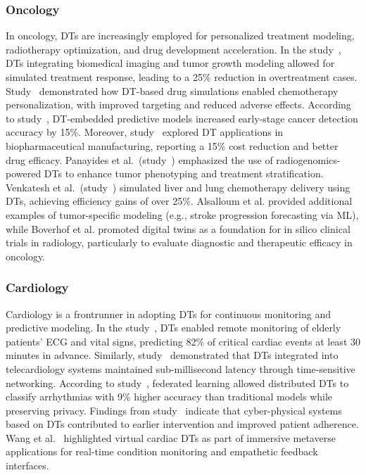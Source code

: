 \documentclass[10pt,a4paper]{article}
\begin{document}
\subsubsection*{Oncology}
In oncology, DTs are increasingly employed for personalized treatment modeling, radiotherapy optimization, and drug development acceleration.  
In the study~\cite{wu2022}, DTs integrating biomedical imaging and tumor growth modeling allowed for simulated treatment response, leading to a 25\% reduction in overtreatment cases. Study~\cite{Balasubramanyam2024} demonstrated how DT-based drug simulations enabled chemotherapy personalization, with improved targeting and reduced adverse effects.  
According to study~\cite{Cellina2023}, DT-embedded predictive models increased early-stage cancer detection accuracy by 15\%.  
Moreover, study~\cite{Puranik2022} explored DT applications in biopharmaceutical manufacturing, reporting a 15\% cost reduction and better drug efficacy. Panayides et al.\ (study~\cite{Panayides2020}) emphasized the use of radiogenomics-powered DTs to enhance tumor phenotyping and treatment stratification.  
Venkatesh et al.\ (study~\cite{Venkatesh2024}) simulated liver and lung chemotherapy delivery using DTs, achieving efficiency gains of over 25\%.  
Alsalloum et al.\cite{Alsalloum2024} provided additional examples of tumor-specific modeling (e.g., stroke progression forecasting via ML), while Boverhof et al.\cite{Boverhof2024} promoted digital twins as a foundation for in silico clinical trials in radiology, particularly to evaluate diagnostic and therapeutic efficacy in oncology.

\subsubsection*{Cardiology}
Cardiology is a frontrunner in adopting DTs for continuous monitoring and predictive modeling.  
In the study~\cite{liu2019}, DTs enabled remote monitoring of elderly patients’ ECG and vital signs, predicting 82\% of critical cardiac events at least 30 minutes in advance. Similarly, study~\cite{Lu2023} demonstrated that DTs integrated into telecardiology systems maintained sub-millisecond latency through time-sensitive networking.  
According to study~\cite{Ali2023}, federated learning allowed distributed DTs to classify arrhythmias with 9\% higher accuracy than traditional models while preserving privacy.  
Findings from study~\cite{Khater2024b} indicate that cyber-physical systems based on DTs contributed to earlier intervention and improved patient adherence.  
Wang et al.~\cite{Wang2025} highlighted virtual cardiac DTs as part of immersive metaverse applications for real-time condition monitoring and empathetic feedback interfaces.
\end{document}
